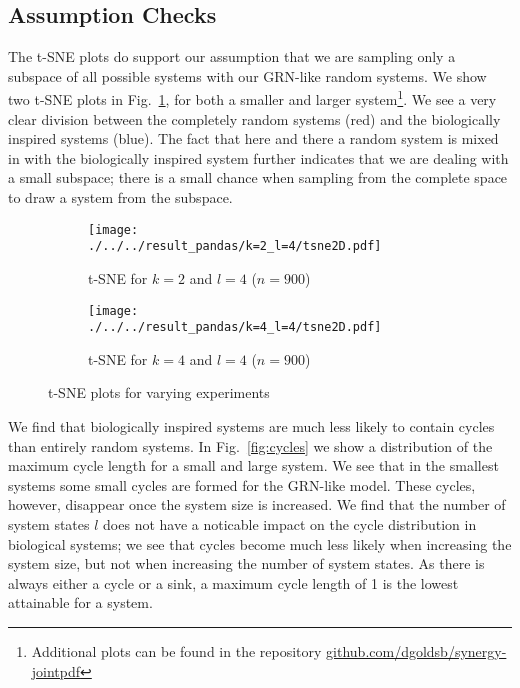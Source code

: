 \documentclass[../main.tex]{subfiles}
\begin{document}
\subsection{Assumption Checks}

The t-SNE plots do support our assumption that we are sampling only a subspace of all possible systems with our GRN-like random systems.
We show two t-SNE plots in Fig.~\ref{fig:TSNE}, for both a smaller and larger system\footnote{Additional plots can be found in the repository \url{github.com/dgoldsb/synergy-jointpdf}}.
We see a very clear division between the completely random systems (red) and the biologically inspired systems (blue).
The fact that here and there a random system is mixed in with the biologically inspired system further indicates that we are dealing with a small subspace; there is a small chance when sampling from the complete space to draw a system from the subspace.

\begin{figure}[H]
    \centering
    \begin{subfigure}[b]{0.4\textwidth}
        \texttt{[image: ./../../result\_pandas/k=2\_l=4/tsne2D.pdf]}
        \caption{t-SNE for $k=2$ and $l=4$ ($n=900$)}
    \end{subfigure}
    \begin{subfigure}[b]{0.4\textwidth}
        \texttt{[image: ./../../result\_pandas/k=4\_l=4/tsne2D.pdf]}
        \caption{t-SNE for $k=4$ and $l=4$ ($n=900$)}
    \end{subfigure}
    \caption{t-SNE plots for varying experiments}
    \label{fig:TSNE}
\end{figure}

We find that biologically inspired systems are much less likely to contain cycles than entirely random systems.
In Fig.~\ref{fig:cycles} we show a distribution of the maximum cycle length for a small and large system.
We see that in the smallest systems some small cycles are formed for the GRN-like model.
These cycles, however, disappear once the system size is increased.
We find that the number of system states $l$ does not have a noticable impact on the cycle distribution in biological systems; we see that cycles become much less likely when increasing the system size, but not when increasing the number of system states. %
As there is always either a cycle or a sink, a maximum cycle length of 1 is the lowest attainable for a system.
\end{document}
